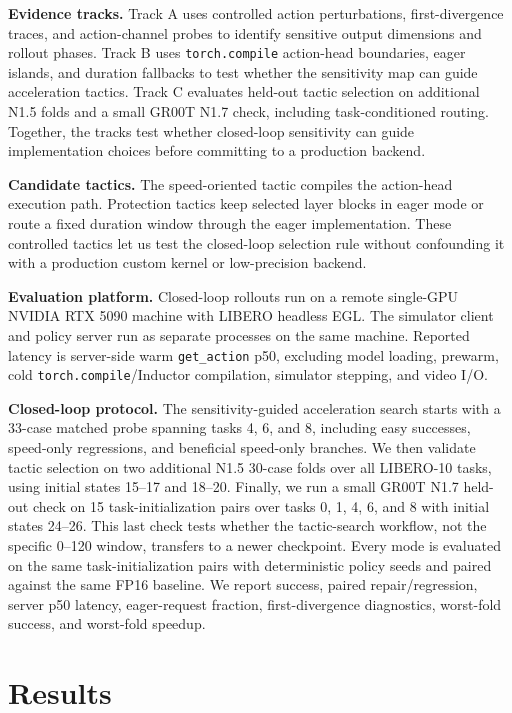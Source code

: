 \documentclass[letterpaper,10pt,twocolumn]{article}
\begin{document}
\textbf{Evidence tracks.}
Track A uses controlled action perturbations, first-divergence traces, and action-channel probes to identify sensitive output dimensions and rollout phases. Track B uses \texttt{torch.compile} action-head boundaries, eager islands, and duration fallbacks to test whether the sensitivity map can guide acceleration tactics. Track C evaluates held-out tactic selection on additional N1.5 folds and a small GR00T N1.7 check, including task-conditioned routing. Together, the tracks test whether closed-loop sensitivity can guide implementation choices before committing to a production backend.

\textbf{Candidate tactics.}
The speed-oriented tactic compiles the action-head execution path. Protection tactics keep selected layer blocks in eager mode or route a fixed duration window through the eager implementation. These controlled tactics let us test the closed-loop selection rule without confounding it with a production custom kernel or low-precision backend.

\textbf{Evaluation platform.}
Closed-loop rollouts run on a remote single-GPU NVIDIA RTX 5090 machine with LIBERO headless EGL. The simulator client and policy server run as separate processes on the same machine. Reported latency is server-side warm \texttt{get\_action} p50, excluding model loading, prewarm, cold \texttt{torch.compile}/Inductor compilation, simulator stepping, and video I/O.

\textbf{Closed-loop protocol.}
The sensitivity-guided acceleration search starts with a 33-case matched probe spanning tasks 4, 6, and 8, including easy successes, speed-only regressions, and beneficial speed-only branches. We then validate tactic selection on two additional N1.5 30-case folds over all LIBERO-10 tasks, using initial states 15--17 and 18--20. Finally, we run a small GR00T N1.7 held-out check on 15 task-initialization pairs over tasks 0, 1, 4, 6, and 8 with initial states 24--26. This last check tests whether the tactic-search workflow, not the specific 0--120 window, transfers to a newer checkpoint. Every mode is evaluated on the same task-initialization pairs with deterministic policy seeds and paired against the same FP16 baseline. We report success, paired repair/regression, server p50 latency, eager-request fraction, first-divergence diagnostics, worst-fold success, and worst-fold speedup.

\section{Results}
\end{document}
